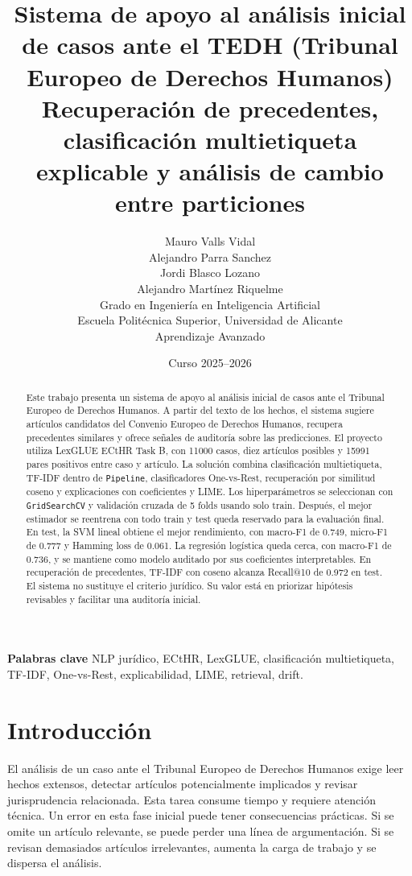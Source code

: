 \documentclass[11pt,a4paper]{article}
\title{\textbf{Sistema de apoyo al análisis inicial de casos ante el TEDH (Tribunal Europeo de Derechos Humanos)}\\
\large Recuperación de precedentes, clasificación multietiqueta explicable y análisis de cambio entre particiones}
\author{
    Mauro Valls Vidal\\
    Alejandro Parra Sanchez\\
    Jordi Blasco Lozano\\
    Alejandro Martínez Riquelme\\[0.4em]
    \small Grado en Ingeniería en Inteligencia Artificial\\
    \small Escuela Politécnica Superior, Universidad de Alicante\\
    \small Aprendizaje Avanzado
}
\date{Curso 2025--2026}
\begin{document}
\maketitle

\begin{abstract}
Este trabajo presenta un sistema de apoyo al análisis inicial de casos ante el Tribunal Europeo de Derechos Humanos. A partir del texto de los hechos, el sistema sugiere artículos candidatos del Convenio Europeo de Derechos Humanos, recupera precedentes similares y ofrece señales de auditoría sobre las predicciones. El proyecto utiliza LexGLUE ECtHR Task B, con 11000 casos, diez artículos posibles y 15991 pares positivos entre caso y artículo. La solución combina clasificación multietiqueta, TF-IDF dentro de \texttt{Pipeline}, clasificadores One-vs-Rest, recuperación por similitud coseno y explicaciones con coeficientes y LIME. Los hiperparámetros se seleccionan con \texttt{GridSearchCV} y validación cruzada de 5 folds usando solo train. Después, el mejor estimador se reentrena con todo train y test queda reservado para la evaluación final. En test, la SVM lineal obtiene el mejor rendimiento, con macro-F1 de 0.749, micro-F1 de 0.777 y Hamming loss de 0.061. La regresión logística queda cerca, con macro-F1 de 0.736, y se mantiene como modelo auditado por sus coeficientes interpretables. En recuperación de precedentes, TF-IDF con coseno alcanza Recall@10 de 0.972 en test. El sistema no sustituye el criterio jurídico. Su valor está en priorizar hipótesis revisables y facilitar una auditoría inicial.
\end{abstract}

\noindent\textbf{Palabras clave}
NLP jurídico, ECtHR, LexGLUE, clasificación multietiqueta, TF-IDF, One-vs-Rest, explicabilidad, LIME, retrieval, drift.

\tableofcontents
\newpage

\section{Introducción}
\label{sec_intro}

El análisis de un caso ante el Tribunal Europeo de Derechos Humanos exige leer hechos extensos, detectar artículos potencialmente implicados y revisar jurisprudencia relacionada. Esta tarea consume tiempo y requiere atención técnica. Un error en esta fase inicial puede tener consecuencias prácticas. Si se omite un artículo relevante, se puede perder una línea de argumentación. Si se revisan demasiados artículos irrelevantes, aumenta la carga de trabajo y se dispersa el análisis.
\end{document}
